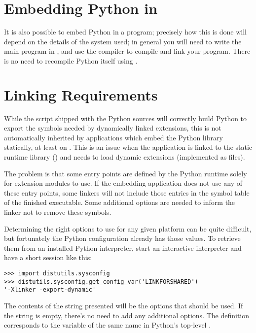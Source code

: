 \section{Embedding Python in \Cpp
     \label{embeddingInCplusplus}}

It is also possible to embed Python in a \Cpp{} program; precisely how this
is done will depend on the details of the \Cpp{} system used; in general you
will need to write the main program in \Cpp, and use the \Cpp{} compiler
to compile and link your program.  There is no need to recompile Python
itself using \Cpp.


\section{Linking Requirements
         \label{link-reqs}}

While the  script shipped with the Python sources
will correctly build Python to export the symbols needed by
dynamically linked extensions, this is not automatically inherited by
applications which embed the Python library statically, at least on
\UNIX.  This is an issue when the application is linked to the static
runtime library () and needs to load dynamic
extensions (implemented as  files).

The problem is that some entry points are defined by the Python
runtime solely for extension modules to use.  If the embedding
application does not use any of these entry points, some linkers will
not include those entries in the symbol table of the finished
executable.  Some additional options are needed to inform the linker
not to remove these symbols.

Determining the right options to use for any given platform can be
quite difficult, but fortunately the Python configuration already has
those values.  To retrieve them from an installed Python interpreter,
start an interactive interpreter and have a short session like this:

\begin{verbatim}
>>> import distutils.sysconfig
>>> distutils.sysconfig.get_config_var('LINKFORSHARED')
'-Xlinker -export-dynamic'
\end{verbatim}

The contents of the string presented will be the options that should
be used.  If the string is empty, there's no need to add any
additional options.  The  definition
corresponds to the variable of the same name in Python's top-level
.
